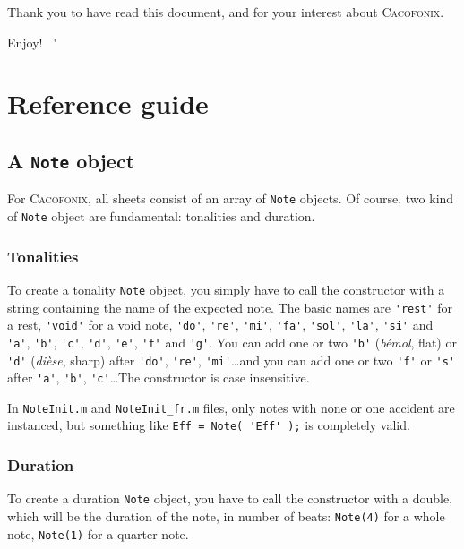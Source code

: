 \documentclass{article}
\newcommand\cacofonix{\textsc{Cacofonix}\xspace}
\newcommand\note{\lstinline!Note!\xspace}
\newcommand\noteInitFile{\texttt{NoteInit.m}\xspace}
\newcommand\noteInitFrFile{\texttt{NoteInit\_fr.m}\xspace}
\newenvironment{myselfenv}{ \par \noindent \makebox[6em][r]{ \textcolor{myselfcolor}{Myself}: " --~}}{~"}
\newcommand{ \myself }[1]{%
\begin{myselfenv}%
	#1%
\end{myselfenv} }
\begin{document}
Thank you to have read this document, and for your interest about \cacofonix.

\myself{ Enjoy! }

\section{Reference guide}

\subsection{A \note object}

For \cacofonix, all sheets consist of an array of \lstinline!Note! objects. Of course, two kind of \lstinline!Note! object are fundamental: tonalities and duration.

\subsubsection{Tonalities}
\label{sec:Tonalities}

To create a tonality \lstinline!Note! object, you simply have to call the constructor with a string containing the name of the expected note. The basic names are \lstinline!'rest'! for a rest, \lstinline!'void'! for a void note, \lstinline!'do'!, \lstinline!'re'!, \lstinline!'mi'!, \lstinline!'fa'!, \lstinline!'sol'!, \lstinline!'la'!, \lstinline!'si'! and \lstinline!'a'!, \lstinline!'b'!, \lstinline!'c'!, \lstinline!'d'!, \lstinline!'e'!, \lstinline!'f'! and \lstinline!'g'!. You can add one or two \lstinline!'b'! (\emph{b\'emol}, flat) or \lstinline!'d'! (\emph{di\`ese}, sharp) after \lstinline!'do'!, \lstinline!'re'!, \lstinline!'mi'!\dots and you can add one or two \lstinline!'f'! or \lstinline!'s'! after \lstinline!'a'!, \lstinline!'b'!, \lstinline!'c'!\dots The constructor is case insensitive.

In \noteInitFile and \noteInitFrFile files, only notes with none or one accident are instanced, but something like \lstinline!Eff = Note( 'Eff' );! is completely valid.

\subsubsection{Duration}

To create a duration \lstinline!Note! object, you have to call the constructor with a double, which will be the duration of the note, in number of beats: \lstinline!Note(4)! for a whole note, \lstinline!Note(1)! for a quarter note.
\end{document}
